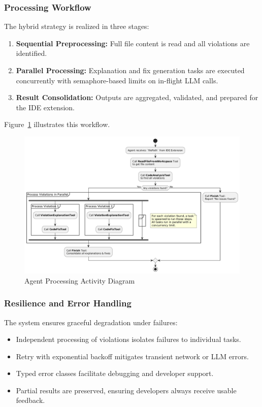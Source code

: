 \begin{spacing}{1.2}
\subsubsection{Processing Workflow}
The hybrid strategy is realized in three stages:
\begin{enumerate}
    \item \textbf{Sequential Preprocessing:} Full file content is read and all violations are identified.
    \item \textbf{Parallel Processing:} Explanation and fix generation tasks are executed concurrently with semaphore-based 
    limits on in-flight LLM calls.
    \item \textbf{Result Consolidation:} Outputs are aggregated, validated, and prepared for the IDE extension.
\end{enumerate}

Figure~\ref{fig:agent_activity} illustrates this workflow.

\begin{figure}[H]
    \centering
    \includegraphics[scale=0.5]{images/activity_diagram.png}
    \caption{Agent Processing Activity Diagram}
    \label{fig:agent_activity}
\end{figure}

\subsubsection{Resilience and Error Handling}
The system ensures graceful degradation under failures:
\begin{itemize}
    \item Independent processing of violations isolates failures to individual tasks.
    \item Retry with exponential backoff mitigates transient network or LLM errors.
    \item Typed error classes facilitate debugging and developer support.
    \item Partial results are preserved, ensuring developers always receive usable feedback.
\end{itemize}


\end{spacing}
